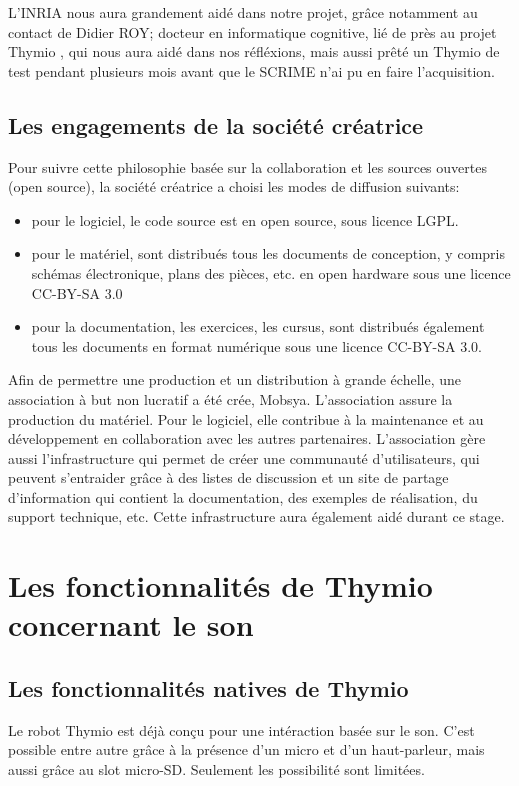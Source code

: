 \documentclass[a4paper, 12pt]{report}
\begin{document}
L'INRIA nous aura grandement aidé dans notre projet, grâce notamment au contact de Didier ROY; docteur en informatique cognitive, lié de près au projet Thymio \pageref{thymio}, qui nous aura aidé dans nos réfléxions, mais aussi prêté un Thymio de test pendant plusieurs mois avant que le SCRIME n'ai pu en faire l'acquisition.

\section{Les engagements de la société créatrice}
Pour suivre cette philosophie basée sur la collaboration et les sources ouvertes (open source), la société créatrice a choisi les modes de diffusion suivants:
\begin{itemize}
\item pour le logiciel, le code source est en open source, sous licence LGPL.
\item pour le matériel, sont distribués tous les documents de conception, y compris schémas électronique, plans des pièces, etc. en open hardware sous une licence CC-BY-SA 3.0
\item pour la documentation, les exercices, les cursus, sont distribués également tous les documents en format numérique sous une licence CC-BY-SA 3.0.
\end{itemize}

Afin de permettre une production et un distribution à grande échelle, une association à but non lucratif a été crée, Mobsya. L'association assure la production du matériel. Pour le logiciel, elle contribue à la maintenance et au développement en collaboration avec les autres partenaires. L'association gère aussi l'infrastructure qui permet de créer une communauté d'utilisateurs, qui peuvent s'entraider grâce à des listes de discussion et un site de partage d'information qui contient la documentation, des exemples de réalisation, du support technique, etc. Cette infrastructure aura également aidé durant ce stage.

\chapter{Les fonctionnalités de Thymio \pageref{thymio} concernant le son}
\section{Les fonctionnalités natives de Thymio \pageref{thymio} }
Le robot Thymio \pageref{thymio} est déjà conçu pour une intéraction basée sur le son. C'est possible entre autre grâce à la présence d'un micro et d'un haut-parleur, mais aussi grâce au slot micro-SD. Seulement les possibilité sont limitées.
\end{document}
